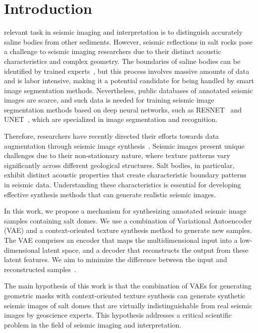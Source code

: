 \documentclass{ieeeaccess}
\begin{document}
\titlepgskip=-21pt

\maketitle

\section{Introduction}
\label{sec:introduction}
 relevant task in seismic imaging and interpretation is to distinguish accurately saline bodies from other sediments. However, seismic reflections in salt rocks pose a challenge to seismic imaging researchers due to their distinct acoustic characteristics and complex geometry. The boundaries of saline bodies can be identified by trained experts~\cite{Zeng2019}, but this process involves massive amounts of data and is labor intensive, making it a potential candidate for being handled by smart image segmentation methods. Nevertheless, public databases of annotated seismic images are scarce, and such data is needed for training seismic image segmentation methods based on deep neural networks, such as RESNET~\cite{He2016} and UNET~\cite{Ronneberger2015}, which are specialized in image segmentation and recognition. 

Therefore, researchers have recently directed their efforts towards data augmentation through seismic image synthesis~\cite{Henriques2021}. Seismic images present unique challenges due to their non-stationary nature, where texture patterns vary significantly across different geological structures. Salt bodies, in particular, exhibit distinct acoustic properties that create characteristic boundary patterns in seismic data. Understanding these characteristics is essential for developing effective synthesis methods that can generate realistic seismic images.

In this work, we propose a mechanism for synthesizing annotated seismic image samples containing salt domes. We use a combination of Variational Autoencoder (VAE) and a context-oriented texture synthesis method to generate new samples. The VAE comprises an encoder that maps the multidimensional input into a low-dimensional latent space, and a decoder that reconstructs the output from these latent features. We aim to minimize the difference between the input and reconstructed samples~\cite{Li2020}.

The main hypothesis of this work is that the combination of VAEs for generating geometric masks with context-oriented texture synthesis can generate synthetic seismic images of salt domes that are virtually indistinguishable from real seismic images by geoscience experts. This hypothesis addresses a critical scientific problem in the field of seismic imaging and interpretation.
\end{document}

